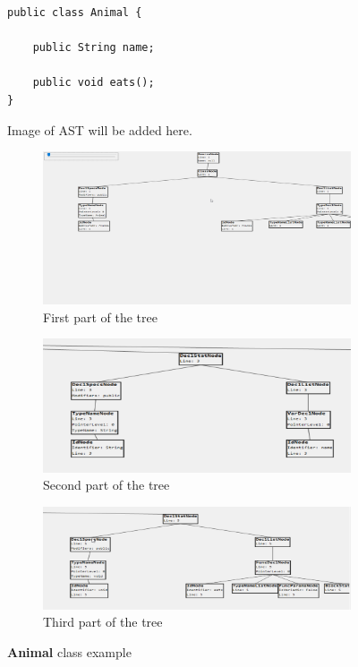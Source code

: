 \documentclass[a4paper]{article}
\begin{document}
\begin{figure}[h!]
\begin{center}
\begin{lstlisting}
public class Animal {

	public String name;
	
	public void eats();
}
\end{lstlisting}
Image of AST will be added here.\\
     \centering
     \begin{subfigure}[b]{\textwidth}
         \centering
         \includegraphics[width=\textwidth]{animal_ast1}
         \caption{First part of the tree}
     \end{subfigure}
     \quad
     \begin{subfigure}[b]{\textwidth}
         \centering
         \includegraphics[width=\textwidth]{animal_ast2}
         \caption{Second part of the tree}
     \end{subfigure}
     \begin{subfigure}[b]{\textwidth}
         \centering
         \includegraphics[width=\textwidth]{animal_ast3}
         \caption{Third part of the tree}
     \end{subfigure}

\caption{\textbf{Animal} class example}
\label{fig:ast3}
\end{center}
\end{figure}
\end{document}
